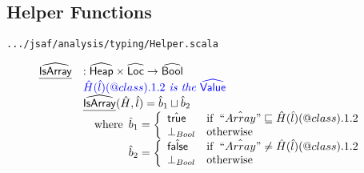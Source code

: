 \documentclass{article}
\makeatletter
\newcommand{\SF}[1]{\mbox{\textsf{#1}}}
\newcommand{\wherec}[1]{{\rm where}\begin{array}[t]{l}#1\end{array}}
\newcommand{\ifc}[1]{{\rm if}\begin{array}[t]{l}#1\end{array}}
\newcommand{\owc}{{\rm otherwise}}
\newcommand{\abs}[1]{\widehat{\SF{#1}}}
\newcommand{\aHeap}{\abs{Heap}}
\newcommand{\aLoc}{\abs{Loc}}
\newcommand{\ahf}[1]{\widehat{\underline{\sf #1}}}
\newcommand{\varprop}[1]{@#1}
\newcommand{\atrue}{\hat{\SF{true}}}
\newcommand{\afalse}{\hat{\SF{false}}}
\def\inblue{\color{blue}}
\makeatother
\begin{document}
\subsection{Helper Functions}
{\inblue\tt .../jsaf/analysis/typing/Helper.scala}

\[
\begin{array}{ll}
\ahf{IsArray} & : \aHeap \times \aLoc \rightarrow \abs{Bool} \\
& {\inblue \hat{H}(\hat{l})(\varprop{class}).1.2\textit{ is the }\abs{Value}} \\
& \ahf{IsArray}(\hat{H},\hat{l}) = \hat{b}_1\sqcup\hat{b}_2\\
& \quad\wherec{
    \hat{b}_1=\left\{
      \begin{array}{ll}
        \atrue &\ifc{\hat{``Array"} \sqsubseteq \hat{H}(\hat{l})(\varprop{class}).1.2}\\
        \bot_{Bool} & \owc \\
      \end{array}
    \right.\\
    \hat{b}_2 = \left\{
      \begin{array}{ll}
        \afalse & \ifc{\hat{``Array"} \neq \hat{H}(\hat{l})(\varprop{class}).1.2}\\
        \bot_{Bool} & \owc\\
      \end{array}
    \right.\\
  }\\
\\
\end{array}
\]
\end{document}
